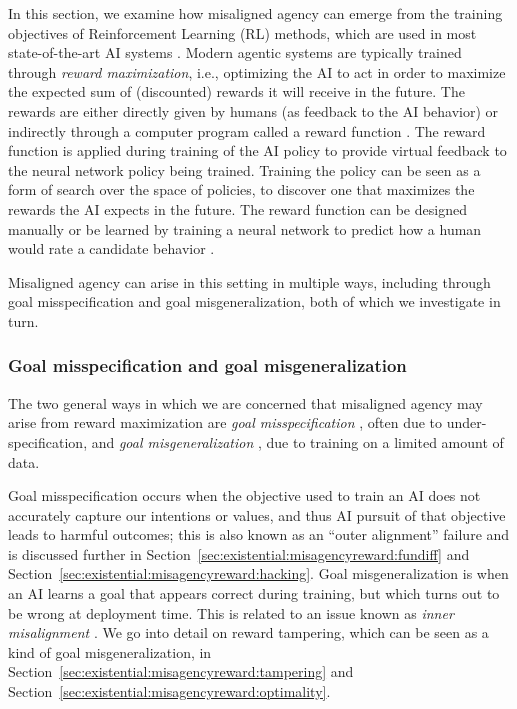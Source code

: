 In this section, we examine how misaligned agency can emerge from the training objectives of Reinforcement Learning (RL) methods, which are used in most state-of-the-art AI systems \cite{proceedings.neurips.cc.paper.files.paper.2022.file.b1efde53be364a73914f58805a001731.Paper.Conference.pdf,www.anthropic.com.news.claudes.constitution,gemini.google.overview.gemini.app.pdf,www.nature.com.articles.s41586.020.03051.4}. Modern agentic systems are typically trained through \textit{reward maximization}, i.e., optimizing the AI to act in order to maximize the expected sum of (discounted) rewards it will receive in the future. The rewards are either directly given by humans (as feedback to the AI behavior) or indirectly through a computer program called a reward function \cite{mitpress.mit.edu.9780262039246.reinforcement.learning}. The reward function is applied during training of the AI policy to provide virtual feedback to the neural network policy being trained. Training the policy can be seen as a form of search over the space of policies, to discover one that maximizes the rewards the AI expects in the future. The reward function can be designed manually or be learned by training a neural network to predict how a human would rate a candidate behavior \cite{dl.acm.org.doi.10.5555.3294996.3295184,arxiv.org.abs.2312.14925}.

Misaligned agency can arise in this setting in multiple ways, including through goal misspecification and goal misgeneralization, both of which we investigate in turn. 

    \subsubsection{Goal misspecification and goal misgeneralization}
    \label{sec:existential:misagencyreward:specvgen}

The two general ways in which we are concerned that misaligned agency may arise from reward maximization are \textit{goal misspecification} \cite{cset.georgetown.edu.wp.content.uploads.Key.Concepts.in.AI.Safety.Specification.in.Machine.Learning.pdf}, often due to under-specification, and \textit{goal misgeneralization} \cite{arxiv.org.abs.2210.01790}, due to training on a limited amount of data.

Goal misspecification occurs when the objective used to train an AI does not accurately capture our intentions or values, and thus AI pursuit of that objective leads to harmful outcomes; this is also known as an ``outer alignment'' failure \cite{arxiv.org.abs.1906.01820} and is discussed further in Section~\ref{sec:existential:misagencyreward:fundiff} and Section~\ref{sec:existential:misagencyreward:hacking}. Goal misgeneralization is when an AI learns a goal that appears correct during training, but which turns out to be wrong at deployment time. This is related to an issue known as \textit{inner misalignment}  \cite{arxiv.org.abs.1906.01820}. We go into detail on reward tampering, which can be seen as a kind of goal misgeneralization, in Section~\ref{sec:existential:misagencyreward:tampering} and Section~\ref{sec:existential:misagencyreward:optimality}. 

